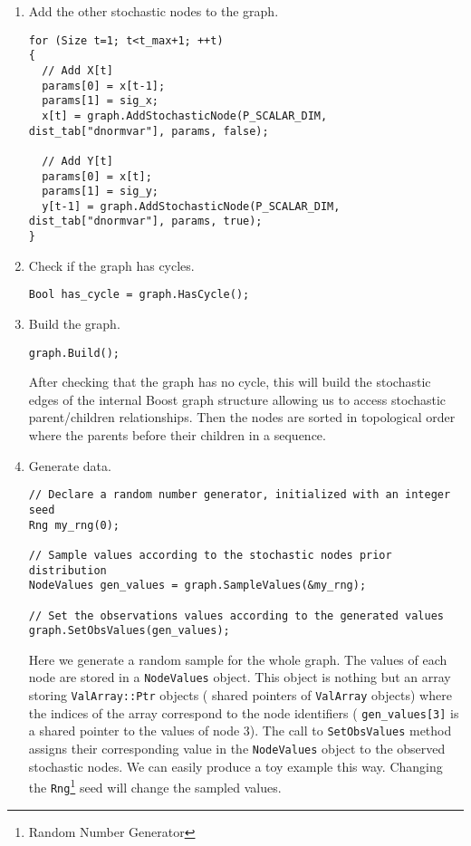 \begin{enumerate}
\item Add the other stochastic nodes to the graph.
\begin{lstlisting}
for (Size t=1; t<t_max+1; ++t)
{
  // Add X[t]
  params[0] = x[t-1];
  params[1] = sig_x;
  x[t] = graph.AddStochasticNode(P_SCALAR_DIM, dist_tab["dnormvar"], params, false);

  // Add Y[t]
  params[0] = x[t];
  params[1] = sig_y;
  y[t-1] = graph.AddStochasticNode(P_SCALAR_DIM, dist_tab["dnormvar"], params, true);
}
\end{lstlisting}


\item Check if the graph has cycles.
\begin{lstlisting}
Bool has_cycle = graph.HasCycle();
\end{lstlisting}

\item Build the graph.
\begin{lstlisting}
graph.Build();
\end{lstlisting}
After checking that the graph has no cycle, this will build the stochastic edges of the internal Boost graph structure allowing us to access stochastic parent/children relationships. Then the nodes are sorted in topological order where the parents before their children in a sequence.


\item Generate data.
\begin{lstlisting}
// Declare a random number generator, initialized with an integer seed
Rng my_rng(0);

// Sample values according to the stochastic nodes prior distribution
NodeValues gen_values = graph.SampleValues(&my_rng);

// Set the observations values according to the generated values
graph.SetObsValues(gen_values);
\end{lstlisting}
Here we generate a random sample for the whole graph. The values of each node are stored in a \texttt{NodeValues} object. This object is nothing but an array storing \texttt{ValArray::Ptr} objects (\ie{} shared pointers of \texttt{ValArray} objects) where the indices of the array correspond to the node identifiers (\ie{} \verb=gen_values[3]= is a shared pointer to the values of node 3). The call to \texttt{SetObsValues} method assigns their corresponding value in the \texttt{NodeValues} object to the observed stochastic nodes. We can easily produce a toy example this way. Changing the \texttt{Rng}\footnote{Random Number Generator} seed will change the sampled values.

\end{enumerate}




